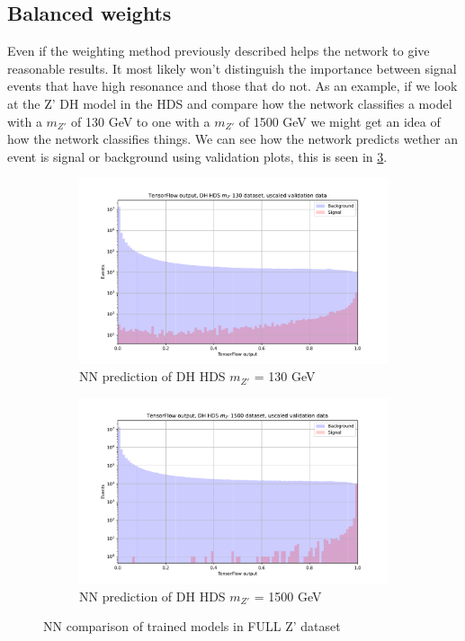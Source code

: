 \documentclass[14pt, a4paper]{book}
\begin{document}
\subsection{Balanced weights}\label{sec:Balanced_wgts}
Even if the weighting method previously described helps the network to give reasonable results. It most likely won't distinguish the importance between signal events that have high resonance and those that do not. 
As an example, if we look at the Z' DH model in the HDS and compare how the network classifies a model with a $m_{Z'}$ of 130 GeV to one with a $m_{Z'}$ of 1500 GeV we might get an idea of how the network classifies things.
We can see how the network predicts wether an event is signal or background using validation plots, this is seen in \ref{fig:PurelyBalanced_DH_HDS}.
\graphicspath{{../../../Plots/TESTING/NeuralNetwork/BALANCED_WEIGHTING/ONLY_BALANCE_MC_EVENTS_BKG_DOWN/}}
\begin{figure}[!ht]
	\centering
	\begin{subfigure}[b]{0.49\textwidth}
        \centering
        \includegraphics[width=1\textwidth]{DH_HDS_mZp_130/VAL_unscaled.pdf}
        \caption{NN prediction of DH HDS $m_{Z'}$ = 130 GeV}\label{fig:PurelyBalanced_DH_HDS_130}
     \end{subfigure}
     \hfill
     \begin{subfigure}[b]{0.49\textwidth}
        \centering
        \includegraphics[width=1\textwidth]{DH_HDS_mZp_1500/VAL_unscaled.pdf}
        \caption{NN prediction of DH HDS $m_{Z'}$ = 1500 GeV}\label{fig:PurelyBalanced_DH_HDS_1500}
     \end{subfigure}
     \caption{NN comparison of trained models in FULL Z' dataset}\label{fig:PurelyBalanced_DH_HDS}
\end{figure}
\end{document}
